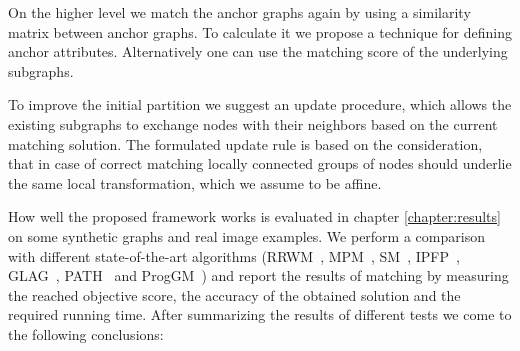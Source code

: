 On the higher level we match the anchor graphs again by using a similarity matrix between anchor graphs. To calculate it we propose a technique for defining anchor attributes. Alternatively one can use the matching score of the underlying subgraphs. 

To improve the initial partition we suggest an update procedure, which allows the existing subgraphs to exchange nodes with their neighbors based on the current matching solution. The formulated update rule is based on the consideration, that in case of correct matching locally connected groups of nodes should underlie the same local transformation, which we assume to be affine.

How well the proposed framework works is evaluated in chapter \ref{chapter:results} on some synthetic graphs and real image examples. We perform a comparison with different state-of-the-art algorithms (RRWM~\cite{Cho2010_RRWM}, MPM~\cite{Cho2014_Haystack}, SM~\cite{Leordeanu2005_SM}, IPFP~\cite{Leordeanu2009_IPFP}, GLAG~\cite{Fiori2013_GLAG}, PATH~\cite{Zazlavskiy2008_PATH} and ProgGM~\cite{Cho2012_ProgressiveGM}) and report the results of matching by measuring the reached objective score, the accuracy of the obtained solution and the required running time. After summarizing the results of different tests we come to the following conclusions:
